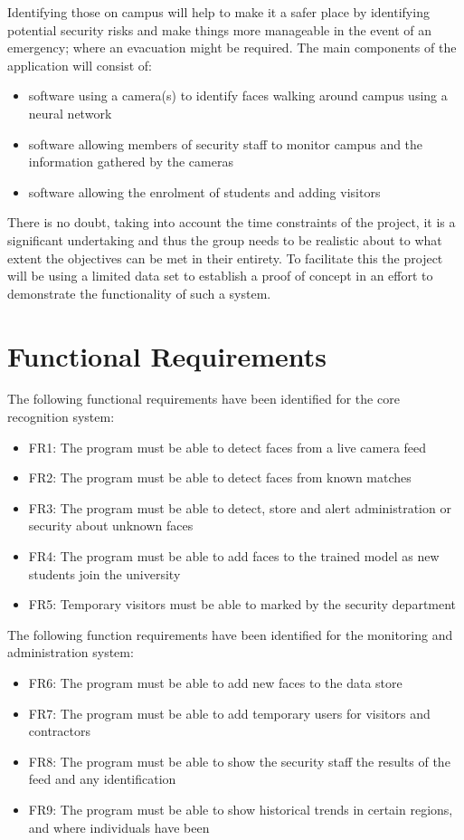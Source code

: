 \documentclass[11pt]{report}
\begin{document}
Identifying those on campus will help to make it a safer place by identifying potential security risks and make things more manageable in the event of an emergency; where an evacuation might be required. The main components of the application will consist of:
\begin{itemize}
	\item software using a camera(s) to identify faces walking around campus using a neural network
	\item software allowing members of security staff to monitor campus and the information gathered by the cameras
	\item software allowing the enrolment of students and adding visitors
\end{itemize}
There is no doubt, taking into account the time constraints of the project, it is a significant undertaking and thus the group needs to be realistic about to what extent the objectives can be met in their entirety. To facilitate this the project will be using a limited data set to establish a proof of concept in an effort to demonstrate the functionality of such a system.

\section{Functional Requirements}

The following functional requirements have been identified for the core recognition system:
\begin{itemize}
	\item FR1: The program must be able to detect faces from a live camera feed
	\item FR2: The program must be able to detect faces from known matches
	\item FR3: The program must be able to detect, store and alert administration or security about unknown faces
	\item FR4: The program must be able to add faces to the trained model as new students join the university
	\item FR5: Temporary visitors must be able to marked by the security department
\end{itemize}

The following function requirements have been identified for the monitoring and administration system:
\begin{itemize}
	\item FR6: The program must be able to add new faces to the data store 
	\item FR7: The program must be able to add temporary users for visitors and contractors
	\item FR8: The program must be able to show the security staff the results of the feed and any identification
	\item FR9: The program must be able to show historical trends in certain regions, and where individuals have been
\end{itemize}
\end{document}
